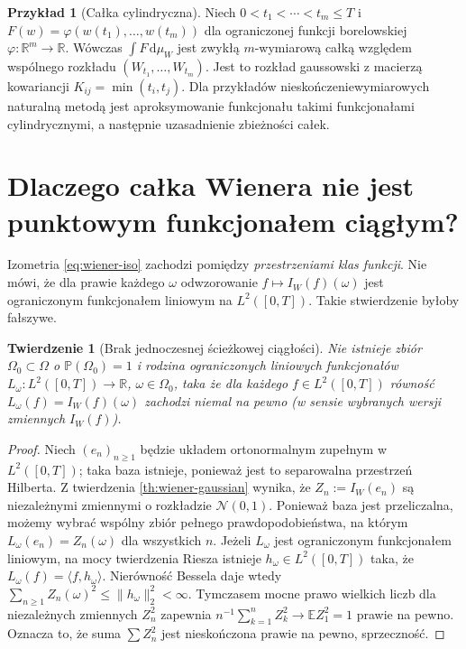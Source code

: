 \documentclass[11pt,a4paper,oneside]{report}
\numberwithin{equation}{chapter}
\theoremstyle{plain}
\newtheorem{twierdzenie}{Twierdzenie}[chapter]
\theoremstyle{definition}
\newtheorem{przyklad}{Przykład}[chapter]
\theoremstyle{remark}
\newcommand{\R}{\mathbb{R}}
\newcommand{\Prob}{\mathbb{P}}
\newcommand{\E}{\mathbb{E}}
\newcommand{\dd}{\mathrm{d}}
\newcommand{\norm}[1]{\lVert #1\rVert}
\newcommand{\Normal}{\mathcal{N}}
\begin{document}
\begin{przyklad}[Całka cylindryczna]
Niech $0<t_1<\cdots<t_m\le T$ i
$F(w)=\varphi(w(t_1),\ldots,w(t_m))$ dla ograniczonej
funkcji borelowskiej $\varphi:\R^m\to\R$.
Wówczas $\int F\,\dd\mu_W$ jest zwykłą
$m$-wymiarową całką względem wspólnego rozkładu
$(W_{t_1},\ldots,W_{t_m})$. Jest to rozkład gaussowski
z macierzą kowariancji $K_{ij}=\min(t_i,t_j)$.
Dla przykładów nieskończeniewymiarowych naturalną metodą
jest aproksymowanie funkcjonału takimi funkcjonałami
cylindrycznymi, a następnie uzasadnienie zbieżności całek.
\end{przyklad}

\section{Dlaczego całka Wienera nie jest punktowym funkcjonałem ciągłym?}
Izometria \eqref{eq:wiener-iso} zachodzi pomiędzy
\emph{przestrzeniami klas funkcji}. Nie mówi, że dla prawie
każdego $\omega$ odwzorowanie
$f\mapsto I_W(f)(\omega)$ jest ograniczonym funkcjonałem
liniowym na $L^2([0,T])$. Takie stwierdzenie byłoby fałszywe.

\begin{twierdzenie}[Brak jednoczesnej ścieżkowej ciągłości]
Nie istnieje zbiór $\Omega_0\subset\Omega$ o
$\Prob(\Omega_0)=1$ i rodzina ograniczonych liniowych
funkcjonałów $L_\omega:L^2([0,T])\to\R$, $\omega\in\Omega_0$,
taka że dla każdego $f\in L^2([0,T])$ równość
$L_\omega(f)=I_W(f)(\omega)$ zachodzi niemal na pewno
(w sensie wybranych wersji zmiennych $I_W(f)$).
\end{twierdzenie}
\begin{proof}
Niech $(e_n)_{n\ge1}$ będzie układem ortonormalnym zupełnym
w $L^2([0,T])$; taka baza istnieje, ponieważ jest to
separowalna przestrzeń Hilberta. Z twierdzenia
\ref{th:wiener-gaussian} wynika, że
$Z_n:=I_W(e_n)$ są niezależnymi zmiennymi o rozkładzie
$\Normal(0,1)$. Ponieważ baza jest przeliczalna, możemy
wybrać wspólny zbiór pełnego prawdopodobieństwa, na którym
$L_\omega(e_n)=Z_n(\omega)$ dla wszystkich $n$.
Jeżeli $L_\omega$ jest ograniczonym funkcjonałem liniowym,
na mocy twierdzenia Riesza istnieje $h_\omega\in L^2([0,T])$
taka, że $L_\omega(f)=\langle f,h_\omega\rangle$.
Nierówność Bessela daje wtedy
$\sum_{n\ge1}Z_n(\omega)^2\le\norm{h_\omega}_2^2<\infty$.
Tymczasem mocne prawo wielkich liczb dla niezależnych
zmiennych $Z_n^2$ zapewnia
$n^{-1}\sum_{k=1}^nZ_k^2\to\E Z_1^2=1$ prawie na pewno.
Oznacza to, że suma $\sum Z_n^2$ jest nieskończona
prawie na pewno, sprzeczność.
\end{proof}
\end{document}
